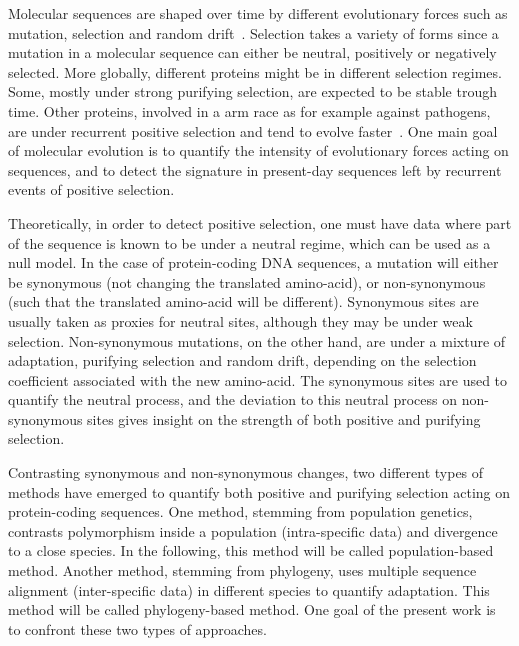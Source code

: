 \documentclass{article}
\begin{document}
Molecular sequences are shaped over time by different evolutionary forces such as mutation, selection and random drift~\citep{Ohta1992}.
Selection takes a variety of forms since a mutation in a molecular sequence can either be neutral, positively or negatively selected.
More globally, different proteins might be in different selection regimes.
Some, mostly under strong purifying selection, are expected to be stable trough time.
Other proteins, involved in a arm race as for example against pathogens, are under recurrent positive selection and tend to evolve faster~\citep{Enard2016}.
One main goal of molecular evolution is to quantify the intensity of evolutionary forces acting on sequences, and to detect the signature in present-day sequences left by recurrent events of positive selection.

Theoretically, in order to detect positive selection, one must have data where part of the sequence is known to be under a neutral regime, which can be used as a null model.
In the case of protein-coding DNA sequences, a mutation will either be synonymous (not changing the translated amino-acid), or non-synonymous (such that the translated amino-acid will be different).
Synonymous sites are usually taken as proxies for neutral sites, although they may be under weak selection.
Non-synonymous mutations, on the other hand, are under a mixture of adaptation, purifying selection and random drift, depending on the selection coefficient associated with the new amino-acid.
The synonymous sites are used to quantify the neutral process, and the deviation to this neutral process on non-synonymous sites gives insight on the strength of both positive and purifying selection.

Contrasting synonymous and non-synonymous changes, two different types of methods have emerged to quantify both positive and purifying selection acting on protein-coding sequences.
One method, stemming from population genetics, contrasts polymorphism inside a population (intra-specific data) and divergence to a close species.
In the following, this method will be called population-based method.
Another method, stemming from phylogeny, uses multiple sequence alignment (inter-specific data) in different species to quantify adaptation.
This method will be called phylogeny-based method.
One goal of the present work is to confront these two types of approaches.
\end{document}
